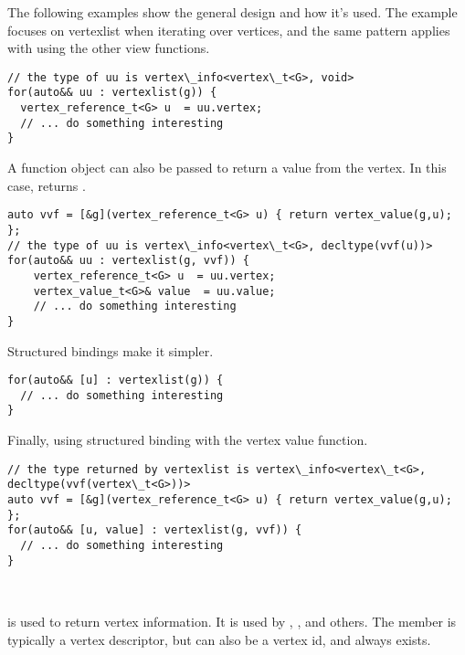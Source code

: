 The following examples show the general design and how it's used. The example focuses 
on vertexlist when iterating over vertices, and the same pattern applies with using the other
view functions.

\begin{lstlisting}
// the type of uu is vertex\_info<vertex\_t<G>, void>
for(auto&& uu : vertexlist(g)) {
  vertex_reference_t<G> u  = uu.vertex;
  // ... do something interesting
}
\end{lstlisting}

A function object can also be passed to return a value from the vertex. In this case,  returns .
\begin{lstlisting}
auto vvf = [&g](vertex_reference_t<G> u) { return vertex_value(g,u); };
// the type of uu is vertex\_info<vertex\_t<G>, decltype(vvf(u))>
for(auto&& uu : vertexlist(g, vvf)) {
    vertex_reference_t<G> u  = uu.vertex;
    vertex_value_t<G>& value  = uu.value;
    // ... do something interesting
}
\end{lstlisting}
    
Structured bindings make it simpler.
\begin{lstlisting}
for(auto&& [u] : vertexlist(g)) {
  // ... do something interesting
}
\end{lstlisting}

Finally, using structured binding with the vertex value function.
\begin{lstlisting}
// the type returned by vertexlist is vertex\_info<vertex\_t<G>, decltype(vvf(vertex\_t<G>))>
auto vvf = [&g](vertex_reference_t<G> u) { return vertex_value(g,u); };
for(auto&& [u, value] : vertexlist(g, vvf)) {
  // ... do something interesting
}
\end{lstlisting}

\subsection{}\label{vertex-view}\mbox{} \\
 is used to return vertex information. It is used by , , 
 and others. The  member is typically a vertex descriptor, but can also be a vertex id, and always
exists.

{\small
     
}

